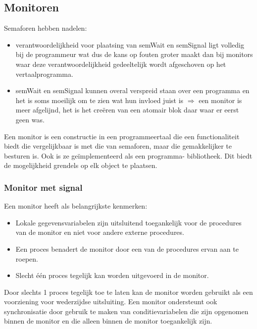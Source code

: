 \subsection{Monitoren}

Semaforen hebben nadelen:

\begin{itemize}
\item verantwoordelijkheid voor plaatsing van semWait en semSignal ligt volledig bij de programmeur wat dus de kans op fouten groter maakt dan bij monitors waar deze verantwoordelijkheid gedeeltelijk wordt afgeschoven op het vertaalprogramma.
\item semWait en semSignal kunnen overal verspreid staan over een programma en het is soms moeilijk om te zien wat hun invloed juist is $\Rightarrow$ een monitor is meer afgelijnd, het is het creëren van een atomair blok daar waar er eerst geen was.
\end{itemize}

Een monitor is een constructie in een programmeertaal die een functionaliteit biedt die vergelijkbaar is met die van semaforen, maar die gemakkelijker te besturen is. Ook is ze geïmplementeerd als een programma- bibliotheek. Dit biedt de mogelijkheid grendels op elk object te plaatsen.

\newpage

\subsubsection{Monitor met signal}

Een monitor heeft als belangrijkste kenmerken:

\begin{itemize}
\item Lokale gegevensvariabelen zijn uitsluitend toegankelijk voor de procedures van de monitor en niet voor andere externe procedures.
\item Een proces benadert de monitor door een van de procedures ervan aan te roepen.
\item Slecht één proces tegelijk kan worden uitgevoerd in de monitor.
\end{itemize}

Door slechts 1 proces tegelijk toe te laten kan de monitor worden gebruikt als een voorziening voor wederzijdse uitsluiting. Een monitor ondersteunt ook synchronisatie door gebruik te maken van conditievariabelen die zijn opgenomen binnen de monitor en die alleen binnen de monitor toegankelijk zijn.

